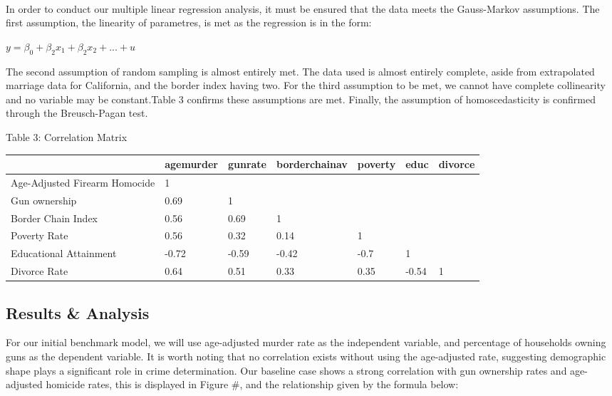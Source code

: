 \documentclass[floatsintext,mask,man]{apa6}
\theoremstyle{definition}
\theoremstyle{definition}
\theoremstyle{definition}
\theoremstyle{remark}
\begin{document}
~

In order to conduct our multiple linear regression analysis, it must be
ensured that the data meets the Gauss-Markov assumptions. The first
assumption, the linearity of parametres, is met as the regression is in
the form:

\begin{center}
    $y=\beta _{0} +\beta _{2} x_{1}+ \beta_{2}x_{2} + ...+u$
    \end{center}

The second assumption of random sampling is almost entirely met. The
data used is almost entirely complete, aside from extrapolated marriage
data for California, and the border index having two. For the third
assumption to be met, we cannot have complete collinearity and no
variable may be constant.Table 3 confirms these assumptions are met.
Finally, the assumption of homoscedasticity is confirmed through the
Breusch-Pagan test.\\

\begin{center}
Table 3: Correlation Matrix
\end{center}

\begin{tabular}{l|l|l|l|l|l|l}
\hline
  & agemurder & gunrate & borderchainav & poverty & educ & divorce\\
\hline
Age-Adjusted Firearm Homocide & 1 &  &  &  &  & \\
\hline
Gun ownership & 0.69 & 1 &  &  &  & \\
\hline
Border Chain Index & 0.56 & 0.69 & 1 &  &  & \\
\hline
Poverty Rate & 0.56 & 0.32 & 0.14 & 1 &  & \\
\hline
Educational Attainment & -0.72 & -0.59 & -0.42 & -0.7 & 1 & \\
\hline
Divorce Rate & 0.64 & 0.51 & 0.33 & 0.35 & -0.54 & 1\\
\hline
\end{tabular}

\subsection{Results \& Analysis}\label{results-analysis}

For our initial benchmark model, we will use age-adjusted murder rate as
the independent variable, and percentage of households owning guns as
the dependent variable. It is worth noting that no correlation exists
without using the age-adjusted rate, suggesting demographic shape plays
a significant role in crime determination. Our baseline case shows a
strong correlation with gun ownership rates and age-adjusted homicide
rates, this is displayed in Figure \#, and the relationship given by the
formula below:
\end{document}
